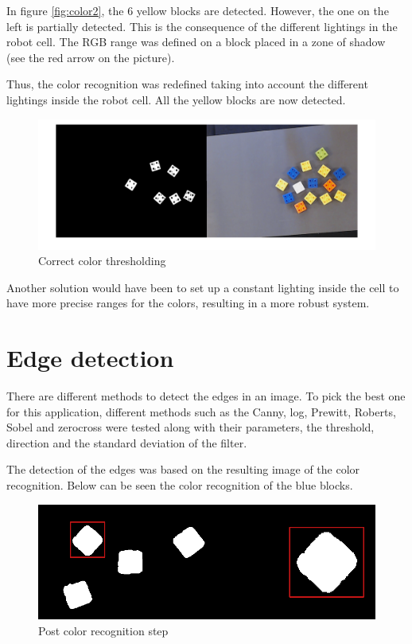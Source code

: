 In figure \ref{fig:color2}, the 6 yellow blocks are detected. However, the one on the left is partially detected. This is the consequence of the different lightings in the robot cell. The RGB range was defined on a block placed in a zone of shadow (see the red arrow on the picture). \par


Thus, the color recognition was redefined taking into account the different lightings inside the robot cell. All the yellow blocks are now detected.



\begin{figure}[H]
  \centering
  \includegraphics[scale=0.3]{figures/Thres_Y_good.png}
  \caption[LABEL] {Correct color thresholding}
\end{figure}

Another solution would have been to set up a constant lighting inside the cell to have more precise ranges for the colors, resulting in a more robust system.



 \section{Edge detection}

	There are different methods to detect the edges in an image. To pick the best one for this application, different methods such as the Canny, log, Prewitt, Roberts, Sobel and zerocross were tested along with their parameters, the threshold, direction and the standard deviation of the filter. \par


	The detection of the edges was based on the resulting image of the color recognition. Below can be seen the color recognition of the blue blocks.

	\begin{figure}[H]
  \centering
  \includegraphics[scale=0.3]{figures/color_rec_zoom.png}
  \caption[LABEL] {Post color recognition step}
\end{figure}	
	


